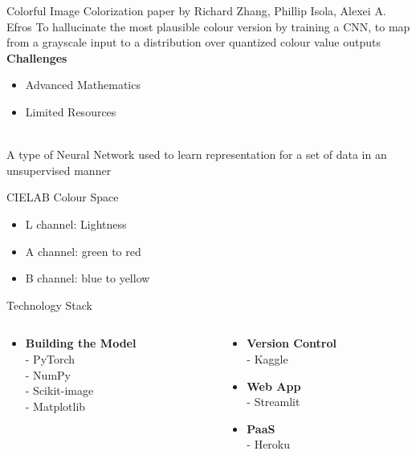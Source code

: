 \documentclass[12pt]{beamer}
\begin{document}
\begin{frame}{Colorful Image Colorization paper by Richard Zhang, Phillip Isola, Alexei A. Efros}
	To hallucinate the most plausible colour version by training a CNN, to map from a grayscale input to a distribution over quantized colour value outputs\\
	\pause
	\textbf{Challenges}\\
	\begin{itemize}
		\item Advanced Mathematics
		\item Limited Resources
	\end{itemize}
\end{frame}

\begin{frame}[standout]
	\\
	A type of Neural Network used to learn representation for a set of data in an unsupervised manner
\end{frame}

\begin{frame}{CIELAB Colour Space}
	\begin{itemize}
		\item L channel: Lightness
		\item A channel: green to red
		\item B channel: blue to yellow
	\end{itemize}
\end{frame}

\begin{frame}{Technology Stack}
	\begin{columns}
		\begin{column}{0.5\textwidth}
			\begin{itemize}
				\item \textbf{Building the Model}\\
					- PyTorch\\
					- NumPy\\
					- Scikit-image\\
					- Matplotlib\\
			\end{itemize}
		\end{column}
		\begin{column}{0.5\textwidth}
			\begin{itemize}
				\item \textbf{Version Control}\\
					- Kaggle\\
				\item \textbf{Web App}\\
					- Streamlit\\
				\item \textbf{PaaS}\\
					- Heroku
			\end{itemize}
		\end{column}
	\end{columns}
\end{frame}
\end{document}
